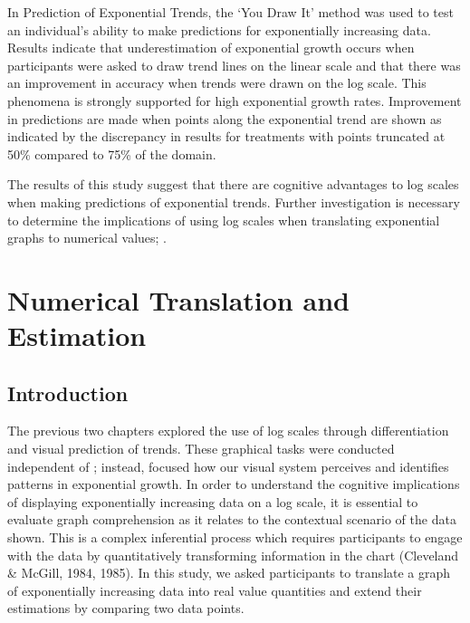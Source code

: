 \documentclass[print]{nuthesis}
\begin{document}
In Prediction of Exponential Trends, the `You Draw It' method was used to test an individual's ability to make predictions for exponentially increasing data.
Results indicate that underestimation of exponential growth occurs when participants were asked to draw trend lines on the linear scale and that there was an improvement in accuracy when trends were drawn on the log scale.
This phenomena is strongly supported for high exponential growth rates.
Improvement in predictions are made when points along the exponential trend are shown as indicated by the discrepancy in results for treatments with points truncated at 50\% compared to 75\% of the domain.

The results of this study suggest that there are cognitive advantages to log scales when making predictions of exponential trends.
Further investigation is necessary to determine the implications of using log scales when translating exponential graphs to numerical values; .

\hypertarget{estimation}{%
\chapter{Numerical Translation and Estimation}\label{estimation}}

\hypertarget{introduction-2}{%
\section{Introduction}\label{introduction-2}}

The previous two chapters explored the use of log scales through differentiation and visual prediction of trends.
These graphical tasks were conducted independent of ; instead,  focused how our visual system perceives and identifies patterns in exponential growth.
In order to understand the cognitive implications of displaying exponentially increasing data on a log scale, it is essential to evaluate graph comprehension as it relates to the contextual scenario of the data shown.
This is a complex inferential process which requires participants to engage with the data by quantitatively transforming information in the chart (Cleveland \& McGill, 1984, 1985).
In this study, we asked participants to translate a graph of exponentially increasing data into real value quantities and extend their estimations by comparing two data points.
\end{document}
